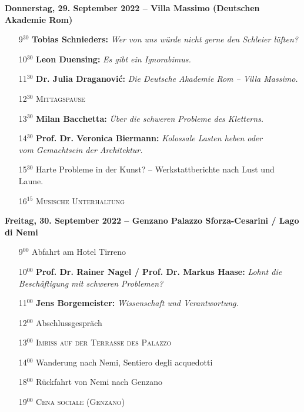\begin{description}
\item {\textbf{Donnerstag, 29. September 2022 -- Villa Massimo (Deutschen Akademie Rom)}}
\begin{itemize}
\item[9$^{30}$]  {\textbf{Tobias Schnieders:}} {\emph{Wer von uns würde nicht gerne den Schleier lüften?}}
\item[10$^{30}$] {\textbf{ Leon Duensing:}} {\emph{Es gibt ein Ignorabimus.}}
\item[11$^{30}$] {\textbf{Dr. Julia Draganović:}} {\emph{Die Deutsche Akademie Rom -- Villa Massimo.}}
\item[12$^{30}$] \hfill {\textsc{Mittagspause}} \hfill ~
\item[13$^{30}$] {\textbf{Milan Bacchetta:}} {\emph{Über die schweren Probleme des Kletterns.}}
\item[14$^{30}$] {\textbf{Prof. Dr. Veronica Biermann:}} {\emph{Kolossale Lasten heben oder \\ vom Gemachtsein 
      der Architektur.}}
\item[15$^{30}$] {Harte Probleme in der Kunst? -- Werkstattberichte nach Lust und Laune.} 
\item[16$^{15}$] \hfill {\textsc{Musische Unterhaltung}} \hfill ~
\end{itemize}
\newpage

\item {\textbf{Freitag, 30. September 2022 --  Genzano Palazzo Sforza-Cesarini / Lago di Nemi}}
\begin{itemize}
\item[9$^{00}$] {Abfahrt am Hotel Tirreno}
\item[10$^{00}$] {\textbf{Prof. Dr. Rainer Nagel / Prof. Dr. Markus Haase:}}
    {\emph{Lohnt die Beschäftigung mit schweren Problemen?}}
\item[11$^{00}$] {\textbf{Jens Borgemeister:}} {\emph{Wissenschaft und Verantwortung.}}
\item[12$^{00}$] {Abschlussgespr\"ach}
\item[13$^{00}$] \hfill {\textsc{Imbiß auf der Terrasse des Palazzo}} \hfill ~
\item[14$^{00}$] \hfill {Wanderung nach Nemi, Sentiero degli acquedotti} \hfill ~
\item[18$^{00}$] {Rückfahrt von Nemi nach Genzano}
\item[19$^{00}$] \hfill {\textsc{Cena sociale (Genzano)}}  \hfill ~
\end{itemize}



\end{description}
